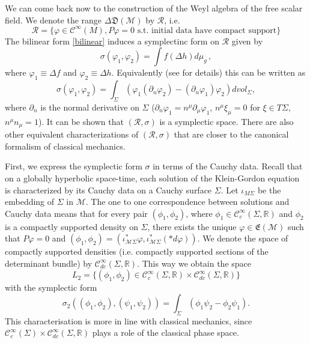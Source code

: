 \documentclass[11pt]{article}
\newcommand{\E}{\mathfrak{E}}
\newcommand{\D}{\mathfrak{D}}
\newcommand{\Mcal}{\mathcal{M}}
\newcommand{\Rcal}{\mathcal{R}}
\newcommand{\Ci}{\mathcal{C}^\infty} %
\newcommand{\RR}{\mathbb{R}}           %
\newcommand{\De}{\Delta}
\newcommand{\ph}{\varphi}
\newcommand{\1}{\mathds{1}}                         %
\begin{document}
{We can come back now to the construction of the Weyl algebra of the free scalar field. We denote the range
$\De\D(\Mcal)$ by $\mathcal{R}$, i.e.
\[
\Rcal=\{\ph \in \mathcal{C}^\infty(M), P\ph=0 \textrm{ s.t. initial data have compact support}\}
\]
The bilinear form \eqref{bilinear} induces a symplectinc form on $\Rcal$ given by
\[
\sigma(\ph_1,\ph_2)=\int f(\Delta h) d\mu_{g}\,,
\]
where $\ph_1\equiv \Delta f$ and $\ph_2\equiv \Delta h$. Equivalently (see \cite{Baer} for details) this can be written as
\[
\sigma(\ph_1,\ph_2) = \int_\Sigma  (\ph_1 (\partial_n \ph_2) - (\partial_n \ph_1)\ph_2)dvol_\Sigma,
\]
where $\partial_n$ is the normal derivative on $\Sigma$ ($\partial_n \ph_1 = n^{\mu} \partial_{\mu}\ph_1$, $n^{\mu} \xi_{\mu}=0 $ for $\xi \in T\Sigma$, $n^{\mu}n_{\mu}=1$). It can
be shown \cite{Dim} that $({\mathcal R},\sigma)$ is
a symplectic space. There are also other equivalent characterizations of $({\mathcal R},\sigma)$ that are closer to the canonical formalism of classical mechanics.

First, we express the symplectic form $\sigma$ in terms of the Cauchy data. Recall that on a globally hyperbolic space-time, each solution of the Klein-Gordon equation is characterized by its Cauchy data on a Cauchy surface $\Sigma$. Let $\iota_{M\Sigma}$ be the embedding of $\Sigma$ in $\Mcal$. The one to one correspondence between solutions and Cauchy data means that for every pair  $(\phi_1, \phi_2)$, where $\phi_1\in\Ci_c(\Sigma,\RR)$ and $\phi_2$ is a compactly supported density on $\Sigma$, there exists the unique $\ph\in\E(\Mcal)$ such that $P\ph=0$ and  $(\phi_1, \phi_2)=(\iota_{\Mcal\Sigma}^*\ph, \iota_{\Mcal\Sigma}^*(*d\ph))$. We denote the space of compactly supported densities (i.e. compactly supported sections of the determinant bundle) by $\Ci_{dc}(\Sigma,\RR)$. This way we obtain the space
\[
L_2 = \{ (\phi_1, \phi_2) \in \mathcal{C}_c^\infty(\Sigma,\RR) \times \mathcal{C}_{dc}^\infty(\Sigma,\RR) \}
\]
with the symplectic form
\[
\sigma_2((\phi_1, \phi_2), (\psi_1, \psi_2)) = \int_\Sigma (\phi_1 \psi_2 - \phi_2 \psi_1).
\] 
This characterisation is more in line with classical mechanics, since $ \mathcal{C}_c^\infty(\Sigma) \times   \mathcal{C}_{dc}^\infty(\Sigma,\RR)$ plays a role of the classical phase space. 
%

}
\end{document}
